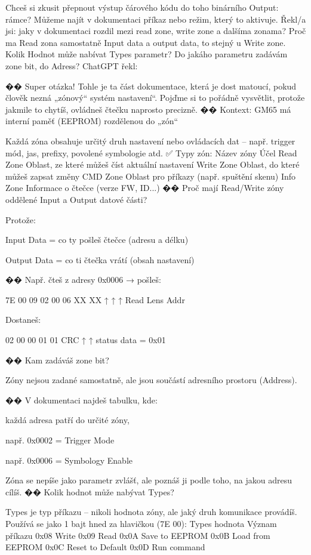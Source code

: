 Chceš si zkusit přepnout výstup čárového kódu do toho binárního Output: rámce? Můžeme najít v dokumentaci příkaz nebo režim, který to aktivuje.
Řekl/a jsi:
jaky v dokumentaci rozdil mezi read zone, write zone a dalšíma zonama? Proč ma Read zona samostatně Input data a output data, to stejný u Write zone. Kolik Hodnot může nabívat Types parametr? Do jakáho parametru zadávám zone bit, do Adress?
ChatGPT řekl:

�� Super otázka! Tohle je ta část dokumentace, která je dost matoucí, pokud člověk nezná „zónový“ systém nastavení“.
Pojďme si to pořádně vysvětlit, protože jakmile to chytíš, ovládneš čtečku naprosto precizně.
�� Kontext: GM65 má interní paměť (EEPROM) rozdělenou do „zón“

Každá zóna obsahuje určitý druh nastavení nebo ovládacích dat – např. trigger mód, jas, prefixy, povolené symbologie atd.
✅ Typy zón:
Název zóny	Účel
Read Zone	Oblast, ze které můžeš číst aktuální nastavení
Write Zone	Oblast, do které můžeš zapsat změny
CMD Zone	Oblast pro příkazy (např. spuštění skenu)
Info Zone	Informace o čtečce (verze FW, ID...)
�� Proč mají Read/Write zóny oddělené Input a Output datové části?

    Protože:

        Input Data = co ty pošleš čtečce (adresu a délku)

        Output Data = co ti čtečka vrátí (obsah nastavení)

�� Např. čteš z adresy 0x0006 → pošleš:

7E 00 09 02 00 06 XX XX
↑      ↑     ↑
Read  Lens   Addr

Dostaneš:

02 00 00 01 01 CRC
↑         ↑
status   data = 0x01

�� Kam zadáváš zone bit?

Zóny nejsou zadané samostatně, ale jsou součástí adresního prostoru (Address).

�� V dokumentaci najdeš tabulku, kde:

    každá adresa patří do určité zóny,

    např. 0x0002 = Trigger Mode

    např. 0x0006 = Symbology Enable

Zóna se nepíše jako parametr zvlášť, ale poznáš ji podle toho, na jakou adresu cílíš.
�� Kolik hodnot může nabývat Types?

Types je typ příkazu – nikoli hodnota zóny, ale jaký druh komunikace provádíš.
Používá se jako 1 bajt hned za hlavičkou (7E 00):
Types hodnota	Význam příkazu
0x08	Write
0x09	Read
0x0A	Save to EEPROM
0x0B	Load from EEPROM
0x0C	Reset to Default
0x0D	Run command

